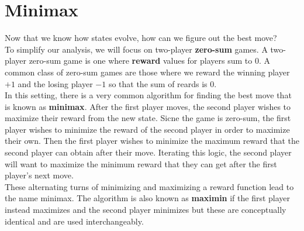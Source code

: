 \documentclass[12pt, letterpaper]{article}
\begin{document}
\section*{Minimax}
Now that we know how states evolve, how can we figure out the best move? \\[0.2cm]
To simplify our analysis, we will focus on two-player \textbf{zero-sum} games. A two-player zero-sum game is one where \textbf{reward} values for players sum to $0$. A common class of zero-sum games are those where we reward the winning player $+1$ and the losing player $-1$ so that the sum of reards is $0$. \\[0.2cm]
In this setting, there is a very common algorithm for finding the best move that is known as \textbf{minimax}. After the first player moves, the second player wishes to maximize their reward from the new state. Sicne the game is zero-sum, the first player wishes to minimize the reward of the second player in order to maximize their own. Then the first player wishes to minimize the maximum reward that the second player can obtain after their move. Iterating this logic, the second player will want to maximize the minimum reward that they can get after the first player's next move. \\[0.2cm]
These alternating turns of minimizing and maximizing a reward function lead to the name minimax. The algorithm is also known as \textbf{maximin} if the first player instead maximizes and the second player minimizes but these are conceptually identical and are used interchangeably.
\newpage
\end{document}
